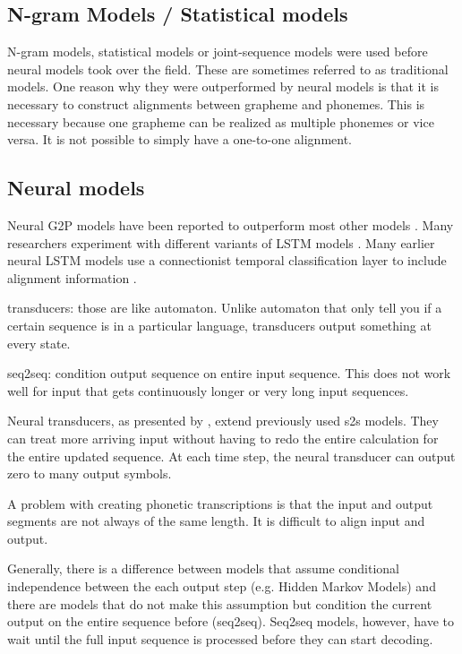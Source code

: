 \subsection{N-gram Models / Statistical models}
N-gram models, statistical models or joint-sequence models were used before neural models took over the field. These are sometimes referred to as traditional models. One reason why they were outperformed by neural models is that it is necessary to construct alignments between grapheme and phonemes. This is necessary because one grapheme can be realized as multiple phonemes or vice versa. It is not possible to simply have a one-to-one alignment. 


\subsection{Neural models}
Neural G2P models have been reported to outperform most other models \citep{Lee&Ashby.2020}. Many researchers experiment with different variants of LSTM models \citep{Lee&Ashby.2020, hammond-2021-data, gautam.2021, Rao2015GraphemetophonemeCU}. Many earlier neural LSTM models use a connectionist temporal classification layer to include alignment information \citep{lo-nicolai-2021-linguistic}. 

transducers: those are like automaton. Unlike automaton that only tell you if a certain sequence is in a particular language, transducers output something at every state. 

seq2seq: condition output sequence on entire input sequence. This does not work well for input that gets continuously longer or very long input sequences. 

Neural transducers, as presented by \citet{jaitly2016neural}, extend previously used \ac{s2s} models. They can treat more arriving input without having to redo the entire calculation for the entire updated sequence. At each time step, the neural transducer can output zero to many output symbols. 


A problem with creating phonetic transcriptions is that the input and output segments are not always of the same length. It is difficult to align input and output. 


Generally, there is a difference between models that assume conditional independence between the each output step (e.g. Hidden Markov Models) and there are models that do not make this assumption but condition the current output on the entire sequence before (seq2seq). Seq2seq models, however, have to wait until the full input sequence is processed before they can start decoding. 

